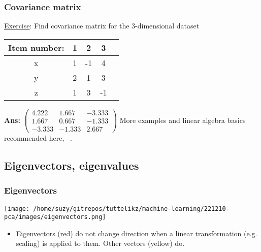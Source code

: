 \documentclass{beamer}
\begin{document}
    \begin{frame}
        \frametitle{Covariance matrix}        
        \underline{Exercise}:  Find covariance matrix for the 3-dimensional dataset
        \begin{center}
            \begin{tabular}{ |c|c|c|c|c| } 
            \hline
            Item number: & 1 & 2 & 3 \\
            \hline
            x & 1  & -1 & 4 \\ 
            y & 2  & 1 & 3 \\ 
            z & 1  & 3 & -1 \\ 
            \hline
            \end{tabular}
        \end{center}
        \textbf{Ans: } $\begin{pmatrix}
            4.222 & 1.667 & -3.333 \\
            1.667 & 0.667 & -1.333 \\
            -3.333 & -1.333 & 2.667
        \end{pmatrix}$
        \vspace{0.5cm}
        More examples and linear algebra basics recommended here, ~\cite{anton2013elementary}.
\end{frame}


    \subsection{Eigenvectors, eigenvalues}
    \begin{frame}
        \frametitle{Eigenvectors}
        \begin{center}
            \texttt{[image: /home/suzy/gitrepos/tuttelikz/machine-learning/221210-pca/images/eigenvectors.png]}
        \end{center}
        \begin{itemize}
          \item Eigenvectors (red) do not change direction when a linear transformation (e.g. scaling) is applied to them. Other vectors (yellow) do.
        \end{itemize}
    \end{frame}
\end{document}
